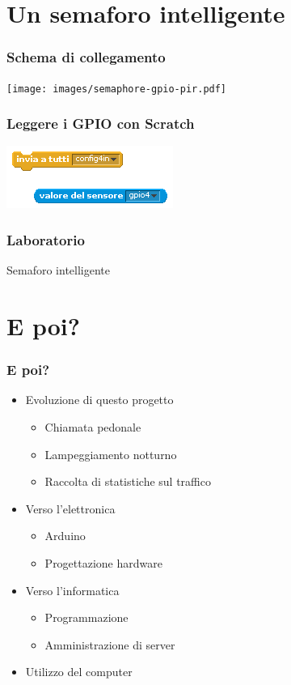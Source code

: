 \documentclass[xetex,table]{beamer}
\begin{document}
\section{Un semaforo intelligente}

\begin{frame}
  \frametitle{Schema di collegamento}
  \begin{center}
    \texttt{[image: images/semaphore-gpio-pir.pdf]}
  \end{center}
\end{frame}

\begin{frame}
  \frametitle{Leggere i GPIO con Scratch}
  \begin{center}
    \includegraphics[height=0.25\textheight]{images/sketch-gpioserver2.png}
  \end{center}
\end{frame}

\begin{frame}
\frametitle{Laboratorio}
  \begin{center}
    \LARGE
    Semaforo intelligente
  \end{center}
\end{frame}

\section{E poi?}

\begin{frame}
  \frametitle{E poi?}
  \begin{itemize}
  \item Evoluzione di questo progetto
    \begin{itemize}
    \item Chiamata pedonale
    \item Lampeggiamento notturno
    \item Raccolta di statistiche sul traffico
    \end{itemize}
  \item Verso l'elettronica
    \begin{itemize}
    \item Arduino
    \item Progettazione hardware
    \end{itemize}
  \item Verso l'informatica
    \begin{itemize}
    \item Programmazione
    \item Amministrazione di server
    \end{itemize}
  \item Utilizzo del computer
  \end{itemize}
\end{frame}
\end{document}
